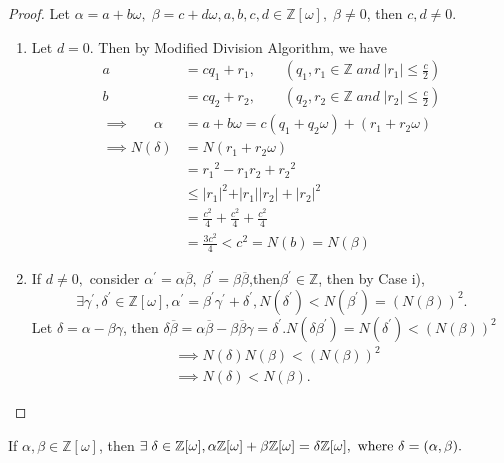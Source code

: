 \documentclass[10pt,a4paper]{article}
\begin{document}
\begin{proof}
Let $\alpha = a+b\omega,\;\beta = c+d\omega,a,b,c,d\in\mathbb{Z}[\omega],\;\beta\neq 0$, then $c,d\neq 0$.
\begin{enumerate}
	\item Let $d=0$. Then by Modified Division Algorithm, we have 
	\begin{align*}
	a &= cq_{1}+r_{1}, \qquad(q_{1},r_{1}\in\mathbb{Z}\;and\;\vert r_{1}\vert\le\frac{c}{2})\\
	b &= cq_{2}+r_{2}, \qquad(q_{2},r_{2}\in\mathbb{Z}\;and\;\vert r_{2}\vert\le\frac{c}{2})\\
	\implies \;\;\;\;\;\;\alpha &= a+b\omega = c(q_{1}+q_{2}\omega)+(r_{1}+r_{2}\omega) \\
	\implies N(\delta) &= N(r_{1}+r_{2}\omega) \\
	&= {r_{1}}^2-r_{1}r_{2}+{r_{2}}^2 \\
	&\le {\vert r_{1}\vert}^2+\vert r_{1}\vert\vert r_{2}\vert+{\vert r_{2}\vert}^2 \\
	&= \frac{c^2}{4} + \frac{c^2}{4} + \frac{c^2}{4} \\
	&= \frac{3c^2}{4} < c^2 = N(b) = N(\beta)
	\end{align*}
	\item If $d\neq 0,$ consider $\alpha^{\prime} = \alpha\overline{\beta},\;\beta^\prime = \beta\overline{\beta}$,\;then\;$\beta^\prime \in \mathbb{Z}$, then by Case i), $$\exists \gamma^\prime,\delta^\prime\in\mathbb{Z}[\omega],\alpha^\prime = \beta^\prime\gamma^\prime+\delta^\prime, N(\delta^\prime)<N(\beta^\prime)={(N(\beta))}^2.$$
Let $\delta = \alpha-\beta\gamma$, then $\delta\overline{\beta} = \alpha\overline{\beta}-\beta\overline{\beta}\gamma = \delta^\prime. N(\delta\beta^\prime) = N(\delta^\prime) < (N(\beta))^2$
\begin{align*}
&\implies N(\delta)N(\beta)<(N(\beta))^2 \\
&\implies N(\delta)<N(\beta).
\end{align*}
\end{enumerate}
\end{proof}

\begin{theorem}
If $\alpha, \beta \in \mathbb{Z}[\omega]$, then $\exists\;\delta \in \mathbb{Z}[\omega], \alpha\mathbb{Z}[\omega]+\beta\mathbb{Z}[\omega] = \delta\mathbb{Z}[\omega],\\ \text{ where }\delta = (\alpha,\beta).$
\end{theorem}
\end{document}
